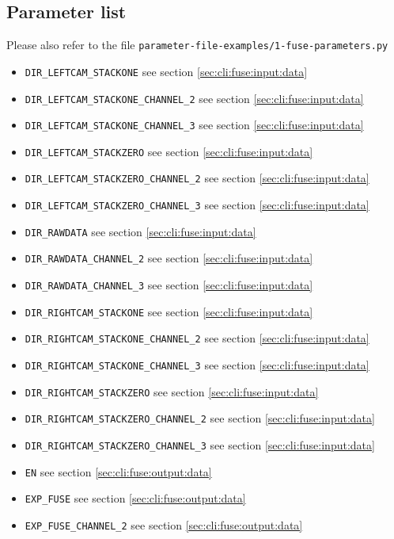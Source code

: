 \subsection{Parameter list}

Please also refer to the file
\texttt{parameter-file-examples/1-fuse-parameters.py}

\begin{itemize}
\itemsep -0.5ex
\item \texttt{DIR\_LEFTCAM\_STACKONE} see section \ref{sec:cli:fuse:input:data}
\item \texttt{DIR\_LEFTCAM\_STACKONE\_CHANNEL\_2} see section \ref{sec:cli:fuse:input:data}
\item \texttt{DIR\_LEFTCAM\_STACKONE\_CHANNEL\_3} see section \ref{sec:cli:fuse:input:data}
\item \texttt{DIR\_LEFTCAM\_STACKZERO} see section \ref{sec:cli:fuse:input:data}
\item \texttt{DIR\_LEFTCAM\_STACKZERO\_CHANNEL\_2} see section \ref{sec:cli:fuse:input:data}
\item \texttt{DIR\_LEFTCAM\_STACKZERO\_CHANNEL\_3} see section \ref{sec:cli:fuse:input:data}
\item \texttt{DIR\_RAWDATA} see section \ref{sec:cli:fuse:input:data}
\item \texttt{DIR\_RAWDATA\_CHANNEL\_2} see section \ref{sec:cli:fuse:input:data}
\item \texttt{DIR\_RAWDATA\_CHANNEL\_3} see section \ref{sec:cli:fuse:input:data}
\item \texttt{DIR\_RIGHTCAM\_STACKONE} see section \ref{sec:cli:fuse:input:data}
\item \texttt{DIR\_RIGHTCAM\_STACKONE\_CHANNEL\_2} see section \ref{sec:cli:fuse:input:data}
\item \texttt{DIR\_RIGHTCAM\_STACKONE\_CHANNEL\_3} see section \ref{sec:cli:fuse:input:data}
\item \texttt{DIR\_RIGHTCAM\_STACKZERO} see section \ref{sec:cli:fuse:input:data}
\item \texttt{DIR\_RIGHTCAM\_STACKZERO\_CHANNEL\_2} see section \ref{sec:cli:fuse:input:data}
\item \texttt{DIR\_RIGHTCAM\_STACKZERO\_CHANNEL\_3} see section \ref{sec:cli:fuse:input:data}
\item \texttt{EN} see section \ref{sec:cli:fuse:output:data}
\item \texttt{EXP\_FUSE} see section \ref{sec:cli:fuse:output:data}
\item \texttt{EXP\_FUSE\_CHANNEL\_2} see section \ref{sec:cli:fuse:output:data}

\end{itemize}
